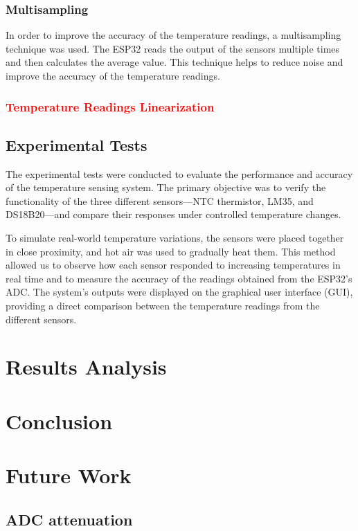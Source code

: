 \documentclass[12pt]{article}
\begin{document}
\subsubsection{Multisampling}

In order to improve the accuracy of the temperature readings, a multisampling technique was used. The ESP32 reads the output of the sensors multiple times and then calculates the average value. This technique helps to reduce noise and improve the accuracy of the temperature readings.
\textcolor{red}{\subsubsection{Temperature Readings Linearization}}

\subsection{Experimental Tests}

    The experimental tests were conducted to evaluate the performance and accuracy of the temperature sensing system. The primary objective was to verify the functionality of the three different sensors—NTC thermistor, LM35, and DS18B20—and compare their responses under controlled temperature changes.

    To simulate real-world temperature variations, the sensors were placed together in close proximity, and hot air was used to gradually heat them. This method allowed us to observe how each sensor responded to increasing temperatures in real time and to measure the accuracy of the readings obtained from the ESP32’s ADC. The system's outputs were displayed on the graphical user interface (GUI), providing a direct comparison between the temperature readings from the different sensors.



\section{Results Analysis}

\section{Conclusion}

\section{Future Work}
\subsection{ADC attenuation }
\end{document}
